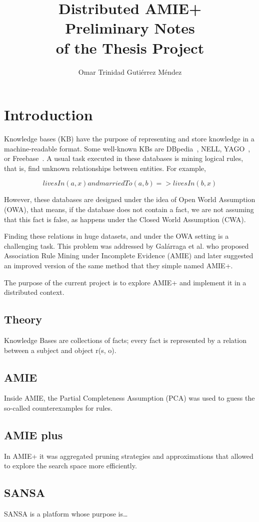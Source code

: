 \documentclass{article}
\title{
Distributed AMIE+\\
\large Preliminary Notes\\
of the Thesis Project\\
}
\author{Omar Trinidad Guti\'errez M\'endez}
\begin{document}
\maketitle

\section{Introduction}

Knowledge bases (KB) have the purpose of representing and store knowledge in a
machine-readable format. Some well-known KBs are DBpedia~\cite{dbpedia-swj},
NELL, YAGO~\cite{suchanek2007yago}, or Freebase~\cite{bollacker2008freebase}. A
usual task executed in these databases is mining logical rules, that is, find
unknown relationships between entities. For example,

\begin{equation*}
livesIn(a, x) and marriedTo(a, b) => livesIn(b, x) 
\end{equation*}

However,  these databases are designed under the idea of Open World Assumption
(OWA), that means, if the database does not contain a fact, we are not assuming
that this fact is false, as happens under the Closed World Assumption (CWA).  

Finding these relations in huge datasets, and under the OWA setting is a
challenging task. This problem was addressed by Galárraga et al. who proposed
Association Rule Mining under Incomplete Evidence (AMIE) and later suggested an
improved version of the same method that they simple named AMIE+. 

The purpose of the current project is to explore AMIE+ and implement it in a
distributed context.

\subsection{Theory}

Knowledge Bases are collections of facts; every fact is represented by a
relation between a subject and object r(s, o).

\subsection{AMIE}

Inside AMIE, the Partial Completeness Assumption (PCA) was used to guess the
so-called counterexamples for rules. 

\subsection{AMIE plus}

In AMIE+ it was aggregated pruning strategies and approximations that allowed
to explore the search space more efficiently.

\subsection{SANSA}

SANSA is a platform whose purpose is\ldots



\end{document}
